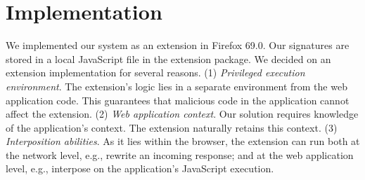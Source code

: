 \section{Implementation} \label{implementation}

We implemented our system as an extension in Firefox 69.0. Our signatures are stored in a local JavaScript file in the extension package. We decided on an extension implementation for several reasons.
(1) \emph{Privileged execution environment}. The extension's logic lies in a separate environment from the web application code. This guarantees that malicious code in the application cannot affect the extension. %
(2) \emph{Web application context}. Our solution requires knowledge of the application's context. %
The extension naturally retains this context.
(3) \emph{Interposition abilities}. As it lies within the browser, the extension can run both at the network level, e.g., rewrite an incoming response; and at the web application level, e.g., interpose on the application's JavaScript execution. %


